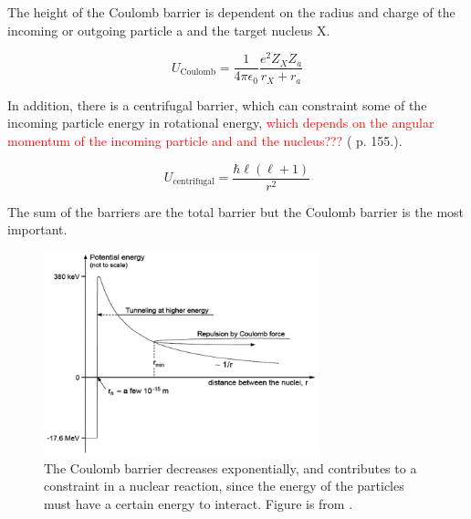 The height of the Coulomb barrier is dependent on the radius and charge of the incoming or outgoing particle a and the target nucleus X.

\begin{equation}
    U_\text{Coulomb} = \frac{1}{4\pi \epsilon_0} \frac{e^2Z_X Z_a}{r_X + r_a}
\end{equation}

In addition, there is a centrifugal barrier, which can constraint some of the incoming particle energy in rotational energy, \textcolor{red}{which depends on the angular momentum of the incoming particle and and the nucleus???} (\cite{Vertes2011a} p. 155.). 

\begin{equation}
    U_\text{centrifugal} = \frac{\hbar \ell (\ell+1)}{r^2}
\end{equation}

The sum of the barriers are the total barrier but the Coulomb barrier is the most important. \\





\begin{figure}
    \centering
    \includegraphics[width=8cm]{Theory/Coulomb_barr.png}
    \caption{The Coulomb barrier decreases exponentially, and contributes to a constraint in a nuclear reaction, since the energy of the particles must have a certain energy to interact. Figure is from \cite{Ongena2018a}. }
    \label{fig:Coulomb_barrier}
\end{figure}



